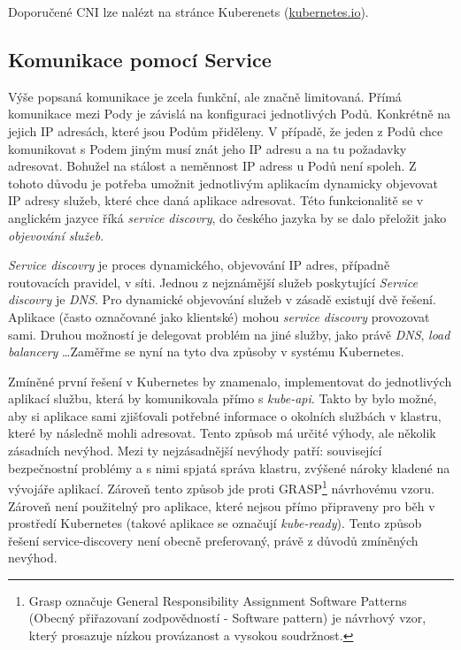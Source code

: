 \cite{thekubernetesauthors_2022_cluster} 
Doporučené CNI lze nalézt na stránce Kuberenets (\href{https://kubernetes.io/docs/concepts/cluster-administration/addons/#networking-and-network-policy}{kubernetes.io}).

\subsection{Komunikace pomocí Service}
Výše popsaná komunikace je zcela funkční, ale značně limitovaná. Přímá komunikace mezi Pody je závislá na konfiguraci jednotlivých Podů. Konkrétně na jejich IP adresách, které jsou Podům přiděleny. V případě, že jeden z Podů chce komunikovat s Podem jiným musí znát jeho IP adresu a na tu požadavky adresovat. Bohužel na stálost a neměnnost IP adress u Podů není spoleh. Z tohoto důvodu je potřeba umožnit jednotlivým aplikacím dynamicky objevovat IP adresy služeb, které chce daná aplikace adresovat. Této funkcionalitě se v anglickém jazyce říká \textit{service discovry}, do českého jazyka by se dalo přeložit jako \textit{objevování služeb}. 

\textit{Service discovry} je proces dynamického, objevování IP adres, případně routovacích pravidel, v síti. Jednou z nejznámější služeb poskytující \textit{Service discovry} je \textit{DNS}. Pro dynamické objevování služeb v zásadě existují dvě řešení. Aplikace (často označované jako klientské) mohou \textit{service discovry} provozovat sami. Druhou možností je delegovat problém na jiné služby, jako právě \textit{DNS}, \textit{load balancery} \ldots Zaměřme se nyní na tyto dva způsoby v systému Kubernetes. 

Zmíněné první řešení v Kubernetes by znamenalo, implementovat do jednotlivých aplikací službu, která by komunikovala přímo s \textit{kube-api}. Takto by bylo možné, aby si aplikace sami zjišťovali potřebné informace o okolních službách v klastru, které by následně mohli adresovat. Tento způsob má určité výhody, ale několik zásadních nevýhod. Mezi ty nejzásadnější nevýhody patří: související bezpečnostní problémy a s nimi spjatá správa klastru, zvýšené nároky kladené na vývojáře aplikací. Zároveň tento způsob jde proti GRASP\footnote{Grasp označuje General Responsibility Assignment Software Patterns (Obecný přiřazovaní zodpovědností - Software pattern) je návrhový vzor, který prosazuje nízkou provázanost a vysokou soudržnost.}\cite{bisi1} návrhovému vzoru. Zároveň není použitelný pro aplikace, které nejsou přímo připraveny pro běh v prostředí Kubernetes (takové aplikace se označují \textit{kube-ready}). Tento způsob řešení service-discovery není obecně preferovaný, právě z důvodů zmíněných nevýhod.


